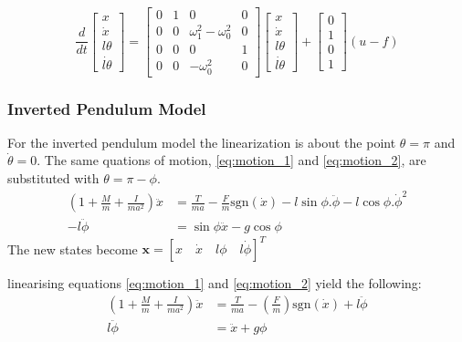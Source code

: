 \documentclass{article}
\begin{document}
\begin{equation}
  \frac{d}{dt} 
  \begin{bmatrix}
     x \\ \dot{x} \\ l\theta \\ \dot{l\theta} \end{bmatrix} = \begin{bmatrix} 
      0 & 1 & 0 & 0 \\ 0 & 0 & \omega_1^2 - \omega_0^2 & 0 \\ 0 & 0 & 0 & 1 \\ 0 & 0 & -\omega_0^2 & 0 \end{bmatrix} \begin{bmatrix} 
        x \\ \dot{x} \\ l\theta \\ \dot{l\theta} \end{bmatrix} + \begin{bmatrix} 
          0 \\ 1 \\ 0 \\ 1 \end{bmatrix} (u - f)
\end{equation}

\subsubsection{Inverted Pendulum Model}

For the inverted pendulum model the linearization is about the point $\theta = \pi$ and $\dot{\theta} = 0$.
The same quations of motion, \ref{eq:motion_1} and \ref{eq:motion_2}, are substituted with $\theta = \pi - \phi$.
\begin{align}
  \left( 1 + \frac{M}{m} + \frac{I}{ma^2} \right) \ddot{x} &= \frac{T}{ma} - \frac{F}{m}\text{sgn}(\dot{x}) - l\sin\phi . \ddot{\phi} - l\cos\phi . \dot{\phi}^2 \\
   - l \ddot{\phi} &= \sin\phi \ddot{x} - g\cos\phi
\end{align}
The new states become $\mathbf{x} = \left[ x \quad \dot{x} \quad l\phi \quad l\dot{\phi} \right]^T$

linearising equations \ref{eq:motion_1} and \ref{eq:motion_2} yield the following:
\begin{align}
  \left( 1 + \frac{M}{m} + \frac{I}{ma^2} \right) \ddot{x} &= \frac{T}{ma} - \left(\frac{F}{m} \right)\text{sgn}(\dot{x}) + l \ddot{\phi} \label{eq:invp_motion_1} \\
  l \ddot{\phi} &= \ddot{x} + g\phi \label{eq:invp_motion_2}
\end{align}
\end{document}
